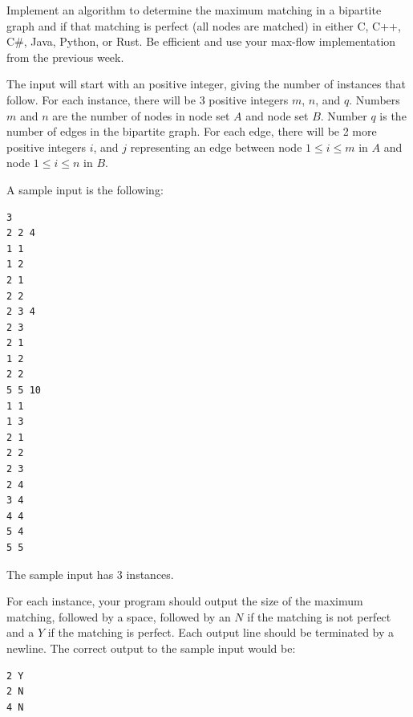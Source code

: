 \documentclass[solutionorbox,answers]{exam}
\begin{document}
\begin{questions}
\begin{solutionbox}{}
\end{solutionbox}

\newpage

\question

Implement an algorithm to determine the maximum matching in a bipartite graph and if that matching is perfect (all nodes are matched) in either C, C++, C\#, Java, Python, or Rust. Be efficient and use your max-flow implementation from the previous week. 

The input will start with an positive integer, giving the number of instances that follow. For each instance, there will be 3 positive integers $m$, $n$, and $q$. Numbers $m$ and $n$ are the number of nodes in node set $A$ and node set $B$. Number $q$ is the number of edges in the bipartite graph. For each edge, there will be 2 more positive integers $i$, and $j$ representing an edge between node $1 \le i \le m$ in $A$ and node $1 \le i \le n$ in $B$. 

A sample input is the following:
\begin{verbatim}
3
2 2 4
1 1
1 2
2 1
2 2
2 3 4
2 3
2 1
1 2
2 2
5 5 10
1 1
1 3
2 1
2 2
2 3
2 4
3 4
4 4
5 4
5 5
\end{verbatim}
The sample input has 3 instances.

For each instance, your program should output the size of the maximum matching, followed by a space, followed by an $N$ if the matching is not perfect and a $Y$ if the matching is perfect. Each output line should be terminated by a newline. The correct output to the sample input would be:
\begin{verbatim}
2 Y
2 N
4 N
\end{verbatim}

\end{questions}
\end{document}
